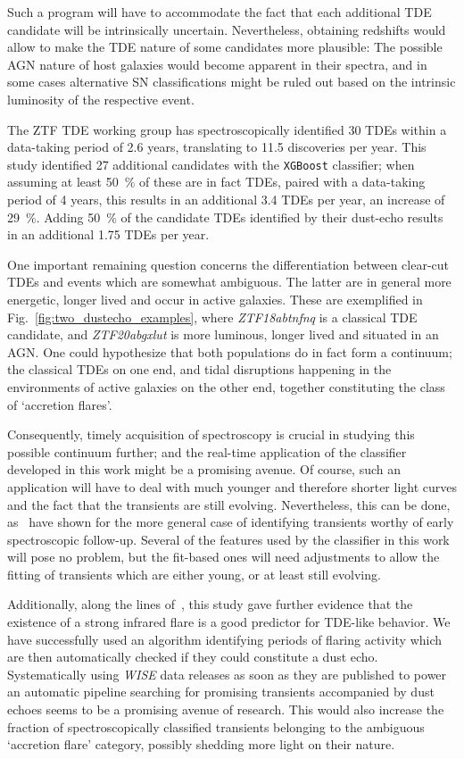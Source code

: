 Such a program will have to accommodate the fact that each additional TDE candidate will be intrinsically uncertain. Nevertheless, obtaining redshifts would allow to make the TDE nature of some candidates more plausible: The possible AGN nature of host galaxies would become apparent in their spectra, and in some cases alternative SN classifications might be ruled out based on the intrinsic luminosity of the respective event.

The ZTF TDE working group has spectroscopically identified 30 TDEs within a data-taking period of 2.6 years, translating to 11.5 discoveries per year. This study identified 27 additional candidates with the \texttt{XGBoost} classifier; when assuming at least \SI{50}{\percent} of these are in fact TDEs, paired with a data-taking period of 4 years, this results in an additional 3.4 TDEs per year, an increase of \SI{29}{\percent}. Adding \SI{50}{\percent} of the candidate TDEs identified by their dust-echo results in an additional 1.75 TDEs per year.

One important remaining question concerns the differentiation between clear-cut TDEs and events which are somewhat ambiguous. The latter are in general more energetic, longer lived and occur in active galaxies. These are exemplified in Fig.~\ref{fig:two_dustecho_examples}, where \textit{ZTF18abtnfnq} is a classical TDE candidate, and \textit{ZTF20abgxlut} is more luminous, longer lived and situated in an AGN. One could hypothesize that both populations do in fact form a continuum; the classical TDEs on one end, and tidal disruptions happening in the environments of active galaxies on the other end, together constituting the class of `accretion flares'.

Consequently, timely acquisition of spectroscopy is crucial in studying this possible continuum further; and the real-time application of the classifier developed in this work might be a promising avenue. Of course, such an application will have to deal with much younger and therefore shorter light curves and the fact that the transients are still evolving. Nevertheless, this can be done, as~ have shown for the more general case of identifying transients worthy of early spectroscopic follow-up. Several of the features used by the classifier in this work will pose no problem, but the fit-based ones will need adjustments to allow the fitting of transients which are either young, or at least still evolving.

Additionally, along the lines of~\cite{Velzen2021}, this study gave further evidence that the existence of a strong infrared flare is a good predictor for TDE-like behavior. We have successfully used an algorithm identifying periods of flaring activity which are then automatically checked if they could constitute a dust echo. Systematically using \textit{WISE} data releases as soon as they are published to power an automatic pipeline searching for promising transients accompanied by dust echoes seems to be a promising avenue of research. This would also increase the fraction of spectroscopically classified transients belonging to the ambiguous `accretion flare' category, possibly shedding more light on their nature.

